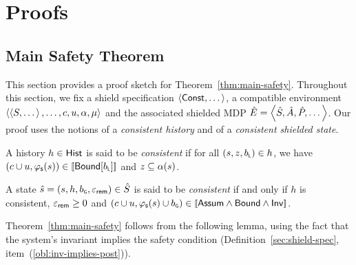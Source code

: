 \documentclass[acmsmall,screen,nonacm]{acmart}
\begin{document}
\section{Proofs}

\subsection{Main Safety Theorem}\label{ap:main-theorem-proof}

This section provides a proof sketch for Theorem~\ref{thm:main-safety}. Throughout this section, we fix a shield specification $\left\langle\mathsf{Const}, \dots\right\rangle$, a compatible environment $\left\langle\left\langle S, \dots\right\rangle, \dots, c, u, \alpha, \mu\right\rangle$ and the associated shielded MDP $\hat E = \left\langle\hat S, \hat A, \hat P,\dots\right\rangle$. Our proof uses the notions of a \emph{consistent history} and of a \emph{consistent shielded state}.

\begin{definition}
  A history $h \in \mathsf{Hist}$ is said to be \emph{consistent} if for all $(s, z, b_\textsf{\tiny L}) \in h$, we have $(c \CatValuation u, \StateMapping(s)) \in \sem{\BoundConj{\LocBounds}}$ and $z \subseteq \alpha(s)$.
\end{definition}

\begin{definition}
  A state $\hat s=(s,h,b_\textsf{\tiny G},\varepsilon_{\mathsf{rem}}) \in \hat S$ is said to be \emph{consistent} if and only if  $h$ is consistent, $\varepsilon_{\mathsf{rem}} \ge 0$ and $(c \CatValuation u, \StateMapping(s) \CatValuation \GlobBounds) \in \sem{\Assum \land \Bound \land \Inv}$.
\end{definition}

Theorem~\ref{thm:main-safety} follows from the following lemma, using the fact that the system's invariant implies the safety condition (Definition~\ref{sec:shield-spec}, item~(\ref{obl:inv-implies-post})).
\end{document}
